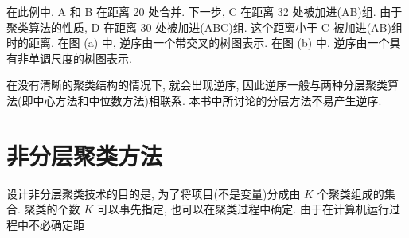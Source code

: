 在此例中, A 和 B 在距离 20 处合并. 下一步, C 在距离 32 处被加进(AB)组.
由于聚类算法的性质, D 在距离 30 处被加进(ABC)组. 这个距离小于 C 被加进(AB)组时的距离.
在图 (a) 中, 逆序由一个带交叉的树图表示. 在图 (b) 中, 逆序由一个具有非单调尺度的树图表示.

在没有清晰的聚类结构的情况下, 就会出现逆序, 因此逆序一般与两种分层聚类算法(即中心方法和中位数方法)相联系.
本书中所讨论的分层方法不易产生逆序.

\section{非分层聚类方法}
\label{sec:12.4}

设计非分层聚类技术的目的是, 为了将项目(不是变量)分成由 $K$ 个聚类组成的集合.
聚类的个数 $K$ 可以事先指定, 也可以在聚类过程中确定. 由于在计算机运行过程中不必确定距
